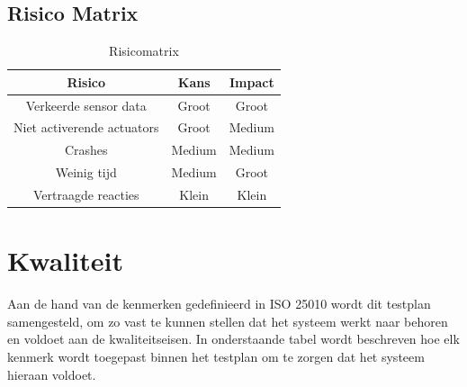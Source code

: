 \documentclass[a4paper]{report}
\begin{document}
\subsection{Risico Matrix}
\begin{table}[h]
  \centering
  \begin{tabular}{|c|c|c|}
    \hline
    \textbf{Risico} & \textbf{Kans} & \textbf{Impact} \\
    \hline 
    Verkeerde sensor data  & \cellcolor{red} Groot & \cellcolor{red} Groot \\
    \hline 
    Niet activerende actuators & \cellcolor{red} Groot & \cellcolor{orange} Medium \\
    \hline 
    Crashes &\cellcolor{orange} Medium &\cellcolor{red} Medium  \\  
    \hline
    Weinig tijd &\cellcolor{orange} Medium &\cellcolor{red} Groot  \\ 
    \hline
    Vertraagde reacties &\cellcolor{green} Klein &\cellcolor{green} Klein  \\  
    \hline
  \end{tabular}
  \caption{Risicomatrix}
  \label{tab:risicomatrix}
\end{table}

\section{Kwaliteit}
Aan de hand van de kenmerken gedefinieerd in ISO 25010\cite{ISO25010} wordt dit testplan samengesteld, om zo vast te kunnen stellen dat het systeem werkt naar behoren en voldoet aan de kwaliteitseisen.
In onderstaande tabel wordt beschreven hoe elk kenmerk wordt toegepast binnen het testplan om te zorgen dat het systeem hieraan voldoet.
\end{document}
